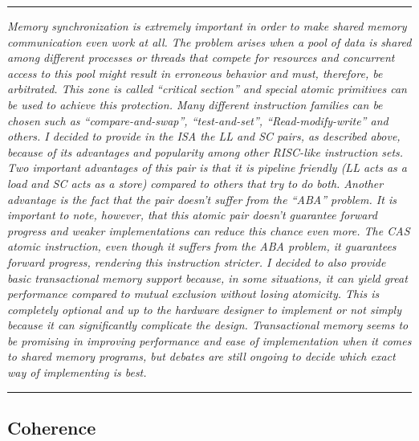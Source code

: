 \documentclass{article}
\begin{document}
        \par\noindent\rule{\textwidth}{0.4pt}
        \textit{Memory synchronization is extremely important in order to make shared memory communication even work at all. The problem arises when a pool of data is shared among different processes or threads that compete for resources and concurrent access to this pool might result in erroneous behavior and must, therefore, be arbitrated. This zone is called ``critical section'' and special atomic primitives can be used to achieve this protection. Many different instruction families can be chosen such as ``compare-and-swap'', ``test-and-set'', ``Read-modify-write'' and others. I decided to provide in the ISA the LL and SC pairs, as described above, because of its advantages and popularity among other RISC-like instruction sets. Two important advantages of this pair is that it is pipeline friendly (LL acts as a load and SC acts as a store) compared to others that try to do both. Another advantage is the fact that the pair doesn't suffer from the ``ABA'' problem. It is important to note, however, that this atomic pair doesn't guarantee forward progress and weaker implementations can reduce this chance even more. The CAS atomic instruction, even though it suffers from the ABA problem, it guarantees forward progress, rendering this instruction stricter. I decided to also provide basic transactional memory support because, in some situations, it can yield great performance compared to mutual exclusion without losing atomicity. This is completely optional and up to the hardware designer to implement or not simply because it can significantly complicate the design. Transactional memory seems to be promising in improving performance and ease of implementation when it comes to shared memory programs, but debates are still ongoing to decide which exact way of implementing is best.}
        \par\noindent\rule{\textwidth}{0.4pt}

        \subsection{Coherence}
\end{document}

